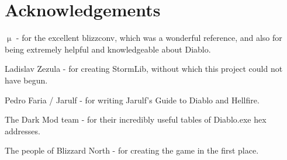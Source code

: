 \chapter*{Acknowledgements}

$\upmu$ - for the excellent blizzconv\cite{blizzconv}, which was a wonderful reference, and also for being extremely helpful and knowledgeable about Diablo.

\mbox{}

\noindent
Ladislav Zezula - for creating StormLib\cite{stormlib}, without which this project could not have begun.

\mbox{}

\noindent
Pedro Faria / Jarulf - for writing Jarulf's Guide to Diablo and Hellfire\cite{jarulf}.

\mbox{}

\noindent
The Dark Mod team - for their incredibly useful tables of Diablo.exe hex addresses\cite{dmodhex}.

\mbox{}

\noindent
The people of Blizzard North - for creating the game in the first place.